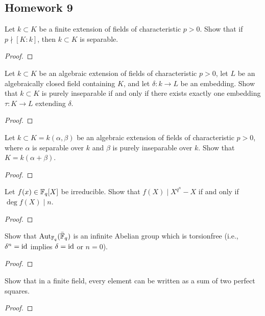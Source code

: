 \subsection{Homework 9}
\begin{problem}
Let $k\subset K$ be a finite extension of fields of characteristic
$p>0$. Show that if $p\nmid [K:k]$, then $k\subset K$ is separable.
\end{problem}
\begin{proof}
\end{proof}

\begin{problem}
Let $k\subset K$ be an algebraic extension of fields of characteristic
$p>0$, let $L$ be an algebraically closed field containing $K$, and let
$\delta\colon k\to L$ be an embedding. Show that $k\subset K$ is purely
inseparable if and only if there exists exactly one embedding $\tau\colon
K\to L$ extending $\delta$.
\end{problem}
\begin{proof}
\end{proof}

\begin{problem}
Let $k\subset K=k(\alpha,\beta)$ be an algebraic extension of fields of
characteristic $p>0$, where $\alpha$ is separable over $k$ and $\beta$ is
purely inseparable over $k$. Show that $K=k(\alpha+\beta)$.
\end{problem}
\begin{proof}
\end{proof}

\begin{problem}
Let $f(x)\in\mathbb{F}_q[X]$ be irreducible. Show that $f(X)\mid X^{q^n}-X$ if
and only if $\deg f(X)\mid n$.
\end{problem}
\begin{proof}
\end{proof}

\begin{problem}
Show that $\operatorname{Aut}_{\mathbb{F}_q}(\bar{\mathbb{F}}_q)$ is an infinite Abelian group
which is torsionfree (i.e., $\delta^n=\operatorname{id}$ implies $\delta=\operatorname{id}$ or $n=0$).
\end{problem}
\begin{proof}
\end{proof}

\begin{problem}
Show that in a finite field, every element can be written as a sum of two
perfect squares.
\end{problem}
\begin{proof}
\end{proof}


